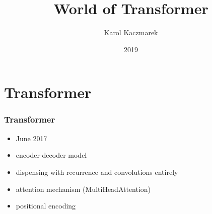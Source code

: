 \documentclass{beamer}
\title{World of Transformer}
\date{2019}
\author{Karol Kaczmarek}
\begin{document}
\begin{frame}
    \titlepage
\end{frame}

\section{Transformer}
\begin{frame}
    \frametitle{Transformer \cite{transformer}}
    \begin{itemize}
        \item June 2017
        \item encoder-decoder model
        \item dispensing with recurrence and convolutions entirely
        \item attention mechanism (MultiHeadAttention)
        \item positional encoding
    \end{itemize}
\end{frame}
\end{document}
